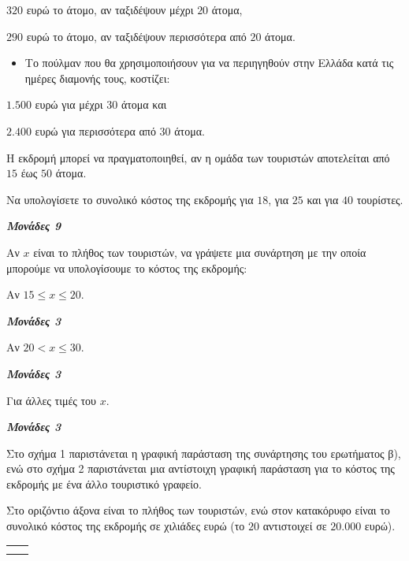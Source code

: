 \documentclass[11pt,a4paper,twoside]{book}
\newcommand{\monades}[1]{
\hspace*{\fill}
\textbf{\textit{\textcolor{maincolor}{Μονάδες #1}}}}
\begin{document}
$320$ ευρώ το άτομο, αν ταξιδέψουν μέχρι $20$ άτομα,

$290$ ευρώ το άτομο, αν ταξιδέψουν περισσότερα από $20$ άτομα.

\begin{itemize}
\item
  Το πούλμαν που θα χρησιμοποιήσουν για να περιηγηθούν στην Ελλάδα κατά τις ημέρες διαμονής τους, κοστίζει:
\end{itemize}

$1.500$ ευρώ για μέχρι $30$ άτομα και

$2.400$ ευρώ για περισσότερα από $30$ άτομα.

Η εκδρομή μπορεί να πραγματοποιηθεί, αν η ομάδα των τουριστών αποτελείται από $15$ έως $50$ άτομα.

\begin{alist}
\item Να υπολογίσετε το συνολικό κόστος της εκδρομής για $18$, για $25$ και για $40$ τουρίστες.
\monades{9}
\item Αν $x$ είναι το πλήθος των τουριστών, να γράψετε μια συνάρτηση με την οποία μπορούμε να υπολογίσουμε το κόστος της εκδρομής:

\begin{rlist}
\item Αν $15 \leq x \leq 20$.
\monades{3}
\item Αν $20 < x \leq 30$.
\monades{3}
\item Για άλλες τιμές του $x$.
\monades{3}
\end{rlist}
\item Στο σχήμα 1 παριστάνεται η γραφική παράσταση της συνάρτησης του ερωτήματος β), ενώ στο σχήμα 2 παριστάνεται μια αντίστοιχη γραφική παράσταση για το κόστος της εκδρομής με ένα άλλο τουριστικό γραφείο.

Στο οριζόντιο άξονα είναι το πλήθος των τουριστών, ενώ στον κατακόρυφο είναι το συνολικό κόστος της εκδρομής σε χιλιάδες ευρώ (το $20$ αντιστοιχεί σε $20.000$ ευρώ).

\begin{longtable}[]{@{}
  >{\centering\arraybackslash}p{}
  >{\centering\arraybackslash}p{}@{}}
\noalign{}
\begin{minipage}[b]{\linewidth}\raggedright
\end{minipage} & \begin{minipage}[b]{\linewidth}\raggedright
\end{minipage} \\
\noalign{}


\end{longtable}
\end{alist}
\end{document}

